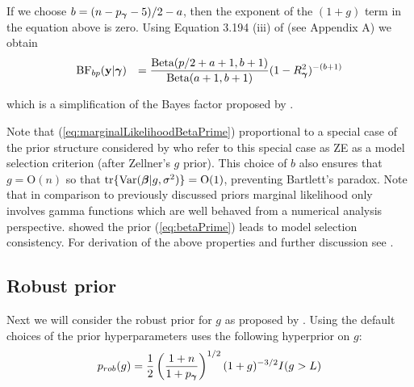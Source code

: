 \documentclass{article}[12pt]
\def\BigO{\mbox{O}}
\begin{document}
\noindent If we choose 
$b = (n - p_{\boldsymbol \gamma} - 5)/2 - a$, then the exponent of the $(1 + g)$ term in the equation above is zero.
Using Equation 3.194 (iii) of \cite{Gradshteyn2007}
(see Appendix A) we obtain
\begin{equation}\label{eq:marginalLikelihoodBetaPrime}
\begin{array}{rl}
\ds \mbox{BF}_{bp}(\vy|\vgamma) 
& \ds 
=   
\frac{\mbox{Beta}(p/2 + a + 1,b + 1)}{\mbox{Beta}(a+1,b+1)} (1-R_\vgamma^2)^{-(b + 1)}
%
\end{array}
\end{equation}

\noindent which is a simplification of the Bayes factor proposed by
\cite{Maruyama2011}.


Note that (\ref{eq:marginalLikelihoodBetaPrime}) proportional
to a special case of the prior structure considered by \cite{Maruyama2011}
who refer to this special case as ZE as a model selection criterion (after Zellner's $g$ prior). This choice of $b$ also ensures that $g = \BigO(n)$ so that $\tr\{\Var(\vbeta | g, \sigma^2)\} = \BigO(1)$, preventing Bartlett's paradox. 
Note that in comparison to previously discussed priors
marginal likelihood only involves gamma functions which
are well behaved from a numerical analysis perspective. 
\cite{Maruyama2011} showed the prior (\ref{eq:betaPrime}) leads to model
selection consistency.
For derivation of the above properties and further discussion see \cite{Maruyama2011}.


\subsection{Robust prior}  

Next we will consider the robust prior for $g$ as proposed by \cite{Bayarri2012}. Using the default
choices of the prior hyperparameters \cite{Bayarri2012} uses the following hyperprior on $g$:
\begin{equation}\label{eq:robustPrior}
p_{{rob}}(g) = \frac{1}{2}\left(\frac{1+n}{1 + p_{\boldsymbol \gamma}}  \right)^{1/2} (1 + g)^{-3/2}I(g > L)
\end{equation}
 
\end{document}
